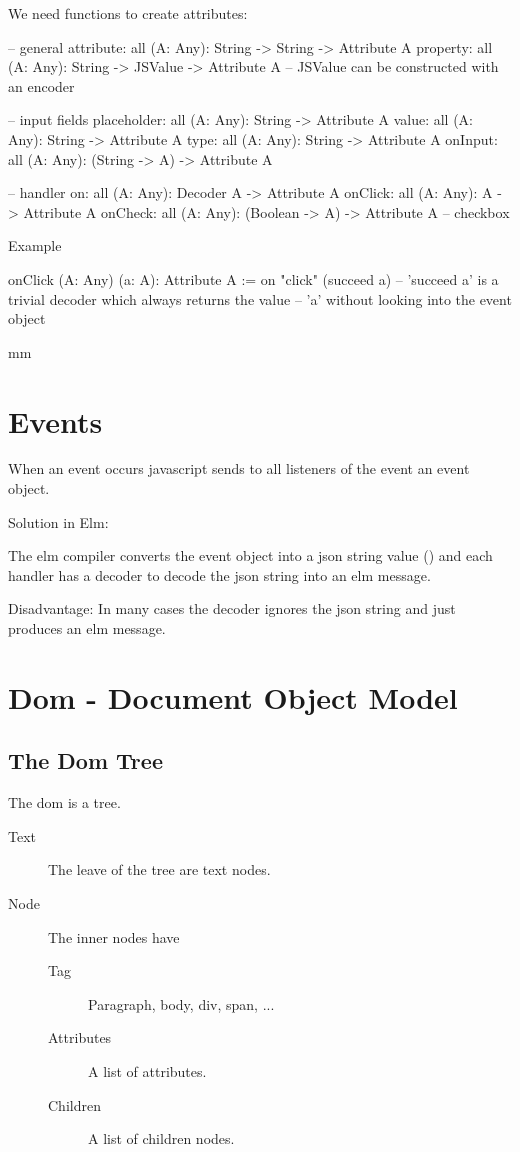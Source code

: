 We need functions to create attributes:
\begin{alba}
    -- general
    attribute:   all (A: Any): String -> String -> Attribute A
    property:    all (A: Any): String -> JSValue -> Attribute A
            -- JSValue can be constructed with an encoder

    -- input fields
    placeholder: all (A: Any): String -> Attribute A
    value:       all (A: Any): String -> Attribute A
    type:        all (A: Any): String -> Attribute A
    onInput:     all (A: Any): (String -> A) -> Attribute A

    -- handler
    on:          all (A: Any): Decoder A -> Attribute A
    onClick:     all (A: Any): A -> Attribute A
    onCheck:     all (A: Any): (Boolean -> A) -> Attribute A -- checkbox
\end{alba}

Example
\begin{alba}
    onClick (A: Any) (a: A): Attribute A :=
        on "click" (succeed a)
    -- 'succeed a' is a trivial decoder which always returns the value
    -- 'a' without looking into the event object
\end{alba}




 mm
\section{Events}

When an event occurs javascript sends to all listeners of the event an event
object.

Solution in Elm:

The elm compiler converts the event object into a json string value
() and each handler has a decoder to decode the json
string into an elm message.

Disadvantage: In many cases the decoder ignores the json string and just
produces an elm message.

\section{Dom - Document Object Model}
\label{sec:dom}


\subsection{The Dom Tree}

The dom is a tree.
\begin{description}
\item[Text] The leave of the tree are text nodes.

\item[Node] The inner nodes have

  \begin{description}
  \item[Tag] Paragraph, body, div, span, ...
  \item[Attributes] A list of attributes.
  \item[Children] A list of children nodes.
  \end{description}

\end{description}

